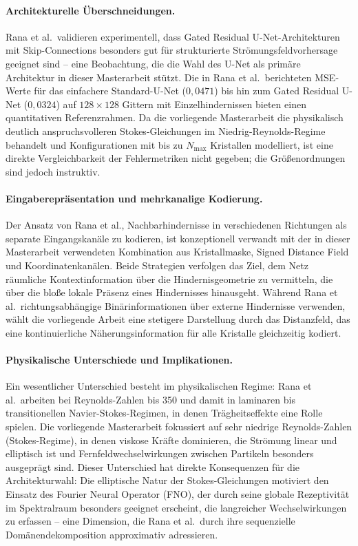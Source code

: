 \documentclass[a4paper,12pt]{article}
\begin{document}
\paragraph{Architekturelle Überschneidungen.}
Rana et al.\ validieren experimentell, dass Gated Residual U-Net-Architekturen mit
Skip-Connections besonders gut für strukturierte Strömungsfeldvorhersage geeignet sind --
eine Beobachtung, die die Wahl des U-Net als primäre Architektur in dieser Masterarbeit
stützt. Die in Rana et al.\ berichteten MSE-Werte für das einfachere Standard-U-Net
($0{,}0471$) bis hin zum Gated Residual U-Net ($0{,}0324$) auf $128 \times 128$ Gittern
mit Einzelhindernissen bieten einen quantitativen Referenzrahmen. Da die vorliegende
Masterarbeit die physikalisch deutlich anspruchsvolleren Stokes-Gleichungen im Niedrig-Reynolds-Regime behandelt und Konfigurationen mit bis zu $N_{\max}$ Kristallen modelliert,
ist eine direkte Vergleichbarkeit der Fehlermetriken nicht gegeben; die Größenordnungen
sind jedoch instruktiv.

\paragraph{Eingaberepräsentation und mehrkanalige Kodierung.}
Der Ansatz von Rana et al., Nachbarhindernisse in verschiedenen Richtungen als separate
Eingangskanäle zu kodieren, ist konzeptionell verwandt mit der in dieser Masterarbeit
verwendeten Kombination aus Kristallmaske, Signed Distance Field und Koordinatenkanälen.
Beide Strategien verfolgen das Ziel, dem Netz räumliche Kontextinformation über die
Hindernisgeometrie zu vermitteln, die über die bloße lokale Präsenz eines Hindernisses
hinausgeht. Während Rana et al.\ richtungsabhängige Binärinformationen über externe
Hindernisse verwenden, wählt die vorliegende Arbeit eine stetigere Darstellung durch das
Distanzfeld, das eine kontinuierliche Näherungsinformation für alle Kristalle gleichzeitig
kodiert.

\paragraph{Physikalische Unterschiede und Implikationen.}
Ein wesentlicher Unterschied besteht im physikalischen Regime: Rana et al.\ arbeiten bei
Reynolds-Zahlen bis 350 und damit in laminaren bis transitionellen Navier-Stokes-Regimen,
in denen Trägheitseffekte eine Rolle spielen. Die vorliegende Masterarbeit fokussiert auf
sehr niedrige Reynolds-Zahlen (Stokes-Regime), in denen viskose Kräfte dominieren, die
Strömung linear und elliptisch ist und Fernfeldwechselwirkungen zwischen Partikeln
besonders ausgeprägt sind. Dieser Unterschied hat direkte Konsequenzen für die Architekturwahl: Die elliptische Natur der Stokes-Gleichungen motiviert den Einsatz des Fourier
Neural Operator (FNO), der durch seine globale Rezeptivität im Spektralraum besonders
geeignet erscheint, die langreicher Wechselwirkungen zu erfassen -- eine Dimension, die
Rana et al.\ durch ihre sequenzielle Domänendekomposition approximativ adressieren.
\end{document}
